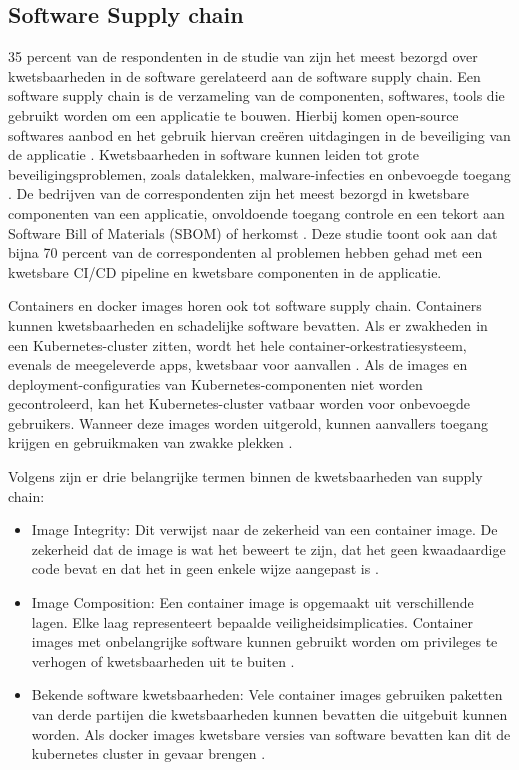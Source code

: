 \subsection{Software Supply chain}
35 percent van de respondenten in de studie van \textcite{red-hat-2023} zijn het meest bezorgd over kwetsbaarheden in de software gerelateerd aan de software supply chain. Een software supply chain is de verzameling van de componenten, softwares, tools die gebruikt worden om een applicatie te bouwen. Hierbij komen open-source softwares aanbod en het gebruik hiervan creëren uitdagingen in de beveiliging van de applicatie \autocite{red-hat-2023}. Kwetsbaarheden in software kunnen leiden tot grote beveiligingsproblemen, zoals datalekken, malware-infecties en onbevoegde toegang \autocite{shamim2020xi}. De bedrijven van de correspondenten zijn het meest bezorgd in kwetsbare componenten van een applicatie, onvoldoende toegang controle en een tekort aan Software Bill of Materials (SBOM) of herkomst \autocite{red-hat-2023}. Deze studie toont ook aan dat bijna 70 percent van de correspondenten al problemen hebben gehad met een kwetsbare CI/CD pipeline en kwetsbare componenten in de applicatie. \newline

Containers en docker images horen ook tot software supply chain. Containers kunnen kwetsbaarheden en schadelijke software bevatten. Als er zwakheden in een Kubernetes-cluster zitten, wordt het hele container-orkestratiesysteem, evenals de meegeleverde apps, kwetsbaar voor aanvallen \autocite{shamim2020xi}. Als de images en deployment-configuraties van Kubernetes-componenten niet worden gecontroleerd, kan het Kubernetes-cluster vatbaar worden voor onbevoegde gebruikers. Wanneer deze images worden uitgerold, kunnen aanvallers toegang krijgen en gebruikmaken van zwakke plekken \autocite{shamim2020xi}. \newline

Volgens \textcite{OWASP-2023} zijn er drie belangrijke termen binnen de kwetsbaarheden van supply chain:
\begin{itemize}
    \item Image Integrity: Dit verwijst naar de zekerheid van een container image. De zekerheid dat de image is wat het beweert te zijn, dat het geen kwaadaardige code bevat en dat het in geen enkele wijze aangepast is \autocite{OWASP-2023}. 
    \item Image Composition: Een container image is opgemaakt uit verschillende lagen. Elke laag representeert bepaalde veiligheidsimplicaties. Container images met onbelangrijke software kunnen gebruikt worden om privileges te verhogen of kwetsbaarheden uit te buiten \autocite{OWASP-2023}. 
    \item Bekende software kwetsbaarheden: Vele container images gebruiken paketten van derde partijen die kwetsbaarheden kunnen bevatten die uitgebuit kunnen worden. Als docker images kwetsbare versies van software bevatten kan dit de kubernetes cluster in gevaar brengen \autocite{OWASP-2023}. 
\end{itemize}


